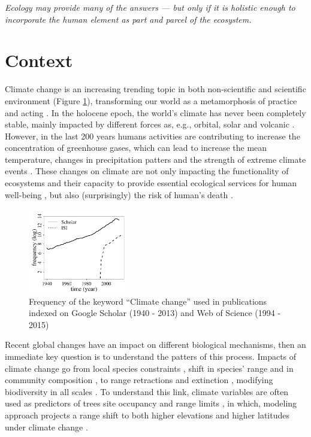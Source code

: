 
\begin{displayquote}
\centering\textit{Ecology may provide many of the answers — but only if it is holistic enough to incorporate the human element as part and parcel of the ecosystem.} \\ 
\end{displayquote}

\section{Context}

Climate change is an increasing trending topic in both non-scientific \parencite{Capstick2015} and scientific environment (Figure \ref{fig:fig1}), transforming our world as a metamorphosis of practice and acting \parencite{Beck2016}.
In the holocene epoch, the world's climate has never been completely stable, mainly impacted by different forces as, e.g., orbital, solar and volcanic \parencite{Wanner2008}.
However, in the last 200 years humans activities are contributing to increase the concentration of greenhouse gases, which can lead to increase the mean temperature, changes in precipitation patters and the strength of extreme climate events \parencite{Cubasch2013}.
These changes on climate are not only impacting the functionality of ecosystems and their capacity to provide essential ecological services for human well-being \parencite{Cardinale2012}, but also (surprisingly) the risk of human's death \parencite{Mora2017}.

\begin{figure}
    \centering
    \includegraphics[width=0.38\textwidth]{img/fig1_em.pdf}
    \caption{Frequency of the keyword ``Climate change'' used in publications indexed on Google Scholar (1940 - 2013) and Web of Science (1994 - 2015)}
    \label{fig:fig1}
\end{figure}

Recent global changes have an impact on different biological mechanisms, then an immediate key question is to understand the patters of this process.
Impacts of climate change go from local species constraints \parencite[e.g. low regeneration;][]{Treyger2011}, shift in species' range \parencite{Boisvert-Marsh2014,Monleon2015} and in community composition \parencite{Dieleman2015}, to range retractions and extinction \parencite{Thomas2006}, modifying biodiversity in all scales \parencite{Penuelas2013}.
To understand this link, climate variables are often used as predictors of trees site occupancy \parencite{Canham2010} and range limits \parencite{Morin2015}, in which, modeling approach projects a range shift to both higher elevations and higher latitudes under climate change \parencite{Chen2011}.

